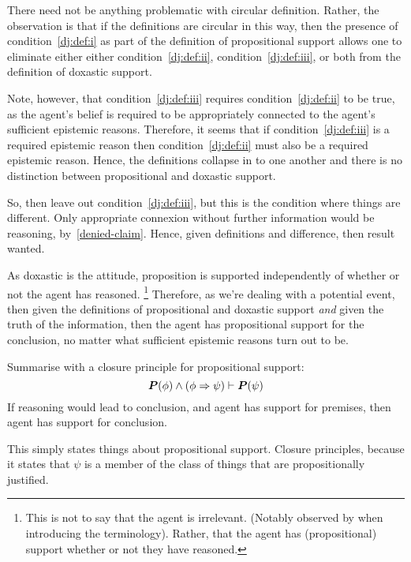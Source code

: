 \begin{note}
  There need not be anything problematic with circular definition.
  Rather, the observation is that if the definitions are circular in this way, then the presence of condition~\ref{dj:def:i} as part of the definition of propositional support allows one to eliminate either either condition~\ref{dj:def:ii}, condition~\ref{dj:def:iii}, or both from the definition of doxastic support.

  Note, however, that condition~\ref{dj:def:iii} requires condition~\ref{dj:def:ii} to be true, as the agent's belief is required to be appropriately connected to the agent's sufficient epistemic reasons.
  Therefore, it seems that if condition~\ref{dj:def:iii} is a required epistemic reason then condition~\ref{dj:def:ii} must also be a required epistemic reason.
  Hence, the definitions collapse in to one another and there is no distinction between propositional and doxastic support.

  So, then leave out condition~\ref{dj:def:iii}, but this is the condition where things are different.
  Only appropriate connexion without further information would be reasoning, by~\ref{denied-claim}.
  Hence, given definitions and difference, then result wanted.

  As doxastic is the attitude, proposition is supported independently of whether or not the agent has reasoned.\nolinebreak
  \footnote{
    This is not to say that the agent is irrelevant. (Notably observed by \cite{Firth:1978vi} when introducing the terminology).
    Rather, that the agent has (propositional) support whether or not they have reasoned.
  }
  Therefore, as we're dealing with a potential event, then given the definitions of propositional and doxastic support \emph{and} given the truth of the information, then the agent has propositional support for the conclusion, no matter what sufficient epistemic reasons turn out to be.
\end{note}

\begin{note}
  Summarise with a closure principle for propositional support:
  \[\bm{P}(\phi) \land (\phi \Rightarrow{} \psi) \vdash \bm{P}(\psi)\]
  If reasoning would lead to conclusion, and agent has support for premises, then agent has support for conclusion.
  
  This simply states things about propositional support.
  Closure principles, because it states that \(\psi\) is a member of the class of things that are propositionally justified.
\end{note}

